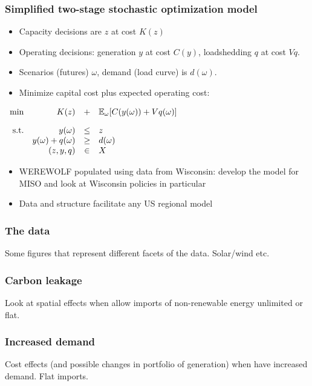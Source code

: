 \documentclass[xcolor=dvipsnames]{beamer}
\newcommand{\expect}{\mathbb{E}}
\begin{document}
\begin{frame}
\frametitle{Simplified two-stage stochastic optimization model}
\begin{itemize}
\item Capacity decisions are $z$ at cost $K(z)$
\item Operating decisions: generation $y$ at cost $C(y)$,
loadshedding $q$ at cost $Vq$.
\item Scenarios (futures) $\omega$, demand (load curve) is $d(\omega)$.
\item Minimize capital cost plus expected operating cost:
\end{itemize}
\begin{center}
$%
\begin{array}{rrcl}
\min & \quad K(z)  & + & \expect_{\omega }[%
C(y(\omega )) + Vq(\omega)] \\[1em]
\text{s.t.} & \quad 
\textcolor{black}{y(\omega)} & \textcolor{black}{\leq} & %
\textcolor{black}{z} \\
& \textcolor{black}{y(\omega) + q(\omega)} & \textcolor{black}{\geq} & %
                                                                       \textcolor{black}{d(\omega)}
  \\
& (z, y, q) & \in & X
\end{array}%
$
\end{center}
\begin{itemize}
\item WEREWOLF populated using data from Wisconsin: develop the model
  for MISO and look at Wisconsin policies in particular
\item Data and structure facilitate any US
  regional model
\end{itemize}
\end{frame}

\begin{frame}
  \frametitle{The data}

  Some figures that represent different facets of the data.
  Solar/wind etc.

\end{frame}



\begin{frame}
  \frametitle{Carbon leakage}

Look at spatial effects when allow imports of non-renewable energy unlimited or flat.

\end{frame}

\begin{frame}
  \frametitle{Increased demand}

Cost effects (and possible changes in portfolio of generation) when
have increased demand.  Flat imports.

\end{frame}
\end{document}

